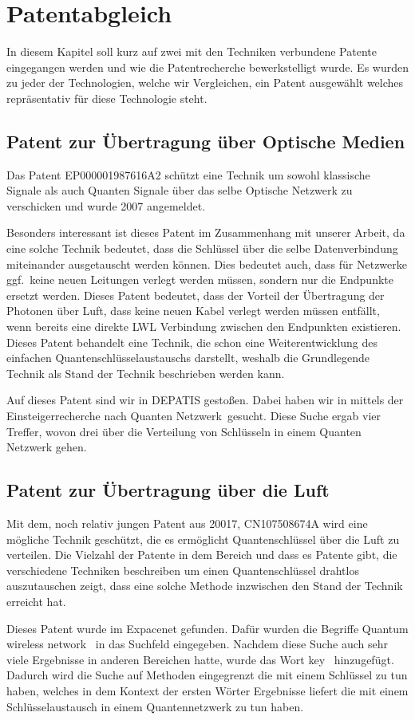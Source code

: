 \chapter{Patentabgleich}

In diesem Kapitel soll kurz auf zwei mit den Techniken verbundene Patente eingegangen werden und wie die Patentrecherche bewerkstelligt wurde.
Es wurden zu jeder der Technologien, welche wir Vergleichen, ein Patent ausgewählt welches repräsentativ für diese Technologie steht.

\section{Patent zur Übertragung über Optische Medien}

Das Patent EP000001987616A2 schützt eine Technik um sowohl klassische Signale als auch Quanten Signale über das selbe Optische Netzwerk zu verschicken und wurde 2007 angemeldet.

Besonders interessant ist dieses Patent im Zusammenhang mit unserer Arbeit, da eine solche Technik bedeutet, dass die Schlüssel über die selbe Datenverbindung miteinander ausgetauscht werden können.
Dies bedeutet auch, dass für Netzwerke ggf.~keine neuen Leitungen verlegt werden müssen, sondern nur die Endpunkte ersetzt werden.
Dieses Patent bedeutet, dass der Vorteil der Übertragung der Photonen über Luft, dass keine neuen Kabel verlegt werden müssen entfällt, wenn bereits eine direkte \ac{LWL} Verbindung zwischen den Endpunkten existieren.
Dieses Patent behandelt eine Technik, die schon eine Weiterentwicklung des einfachen Quantenschlüsselaustauschs darstellt, weshalb die Grundlegende Technik als Stand der Technik beschrieben werden kann.

Auf dieses Patent sind wir in DEPATIS gestoßen.
Dabei haben wir in mittels der Einsteigerrecherche nach \glqq Quanten Netzwerk\grqq~gesucht.
Diese Suche ergab vier Treffer, wovon drei über die Verteilung von Schlüsseln in einem Quanten Netzwerk gehen.

\section{Patent zur Übertragung über die Luft}

Mit dem, noch relativ jungen Patent aus 20017, CN107508674A wird eine mögliche Technik geschützt, die es ermöglicht Quantenschlüssel über die Luft zu verteilen.
Die Vielzahl der Patente in dem Bereich und dass es Patente gibt, die verschiedene Techniken beschreiben um einen Quantenschlüssel drahtlos auszutauschen zeigt, dass eine solche Methode inzwischen den Stand der Technik erreicht hat.

Dieses Patent wurde im Expacenet gefunden.
Dafür wurden die Begriffe \glqq Quantum wireless network \grqq~in das Suchfeld eingegeben.
Nachdem diese Suche auch sehr viele Ergebnisse in anderen Bereichen hatte, wurde das Wort \glqq key \grqq~hinzugefügt.
Dadurch wird die Suche auf Methoden eingegrenzt die mit einem Schlüssel zu tun haben, welches in dem Kontext der ersten Wörter Ergebnisse liefert die mit einem Schlüsselaustausch in einem Quantennetzwerk zu tun haben.
